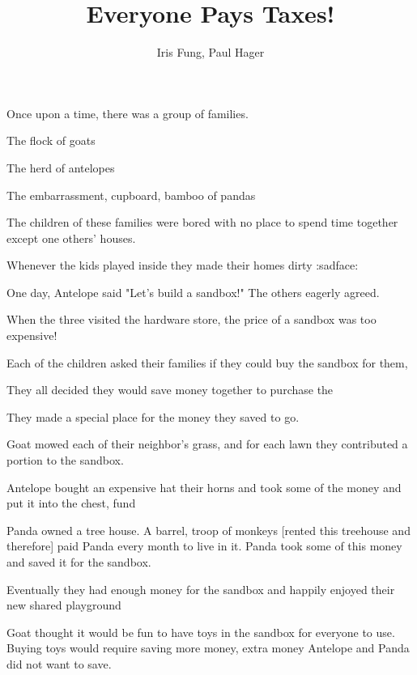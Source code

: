 \documentclass[draft, 12pt]{book}
\title{Everyone Pays Taxes!}
\author{Iris Fung, Paul Hager}
\begin{document}
\frontmatter

\maketitle

\mainmatter

Once upon a time, there was a group of families.

The flock of goats

The herd of antelopes

The {embarrassment, cupboard, bamboo} of pandas

The children of these families were bored with no place to spend time together except one others' houses.

Whenever the kids played inside they made their homes dirty :sadface:

One day, Antelope said "Let's build a sandbox!" The others eagerly agreed. 

When the three visited the hardware store, the price of a sandbox was too expensive!

Each of the children asked their families if they could buy the sandbox for them, 

They all decided they would save money together to purchase the 

They made a special place for the money they saved to go.

Goat mowed each of their neighbor's grass, and for each lawn they contributed a portion to the sandbox.

Antelope bought an expensive hat their horns and took some of the money and put it into the {chest, fund}

Panda owned a tree house.
A {barrel, troop} of monkeys [rented this treehouse and therefore] paid Panda every month to live in it.
Panda took some of this money and saved it for the sandbox.

Eventually they had enough money for the sandbox and happily enjoyed their new shared playground

Goat thought it would be fun to have toys in the sandbox for everyone to use.
Buying toys would require saving more money, extra money Antelope and Panda did not want to save.
\end{document}
